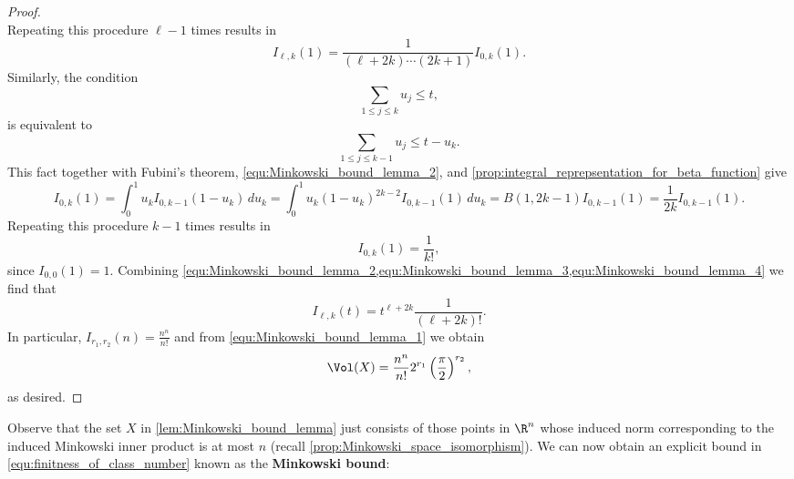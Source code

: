 \begin{proof}
\[        \]
        Repeating this procedure $\ell-1$ times results in
        \begin{equation}\label{equ:Minkowski_bound_lemma_3}
          I_{\ell,k}(1) = \frac{1}{(\ell+2k) \cdots (2k+1)}I_{0,k}(1).
        \end{equation}
        Similarly, the condition
        \[
          \sum_{1 \le j \le k}u_{j} \le t,
        \]
        is equivalent to
        \[
          \sum_{1 \le j \le k-1}u_{j} \le t-u_{k}.
        \]
        This fact together with Fubini's theorem, \cref{equ:Minkowski_bound_lemma_2}, and \cref{prop:integral_reprepsentation_for_beta_function} give
        \[
          I_{0,k}(1) = \int_{0}^{1}u_{k}I_{0,k-1}(1-u_{k})\,du_{k} = \int_{0}^{1}u_{k}(1-u_{k})^{2k-2}I_{0,k-1}(1)\,du_{k} = B(1,2k-1)I_{0,k-1}(1) = \frac{1}{2k}I_{0,k-1}(1).
        \]
        Repeating this procedure $k-1$ times results in
        \begin{equation}\label{equ:Minkowski_bound_lemma_4}
          I_{0,k}(1) = \frac{1}{k!},
        \end{equation}
        since $I_{0,0}(1) = 1$. Combining \cref{equ:Minkowski_bound_lemma_2,equ:Minkowski_bound_lemma_3,equ:Minkowski_bound_lemma_4} we find that
        \[
          I_{\ell,k}(t) = t^{\ell+2k}\frac{1}{(\ell+2k)!}.
        \]
        In particular, $I_{r_{1},r_{2}}(n) = \frac{n^{n}}{n!}$ and from \cref{equ:Minkowski_bound_lemma_1} we obtain
        \[
          \Vol(X) = \frac{n^{n}}{n!}2^{r_{1}}\left(\frac{\pi}{2}\right)^{r_{2}},
        \]
        as desired.
      \end{proof}

      Observe that the set $X$ in \cref{lem:Minkowski_bound_lemma} just consists of those points in $\R^{n}$ whose induced norm corresponding to the induced Minkowski inner product is at most $n$ (recall \cref{prop:Minkowski_space_isomorphism}). We can now obtain an explicit bound in \cref{equ:finitness_of_class_number} known as the \textbf{Minkowski bound}:

